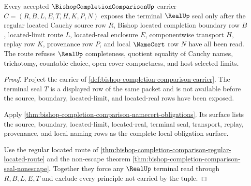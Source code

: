 \begin{theorem}
\label{thm:bishop-completion-comparison-real-route}
Every accepted $\BishopCompletionComparisonUp$ carrier $C=(R,B,L,E,T,H,K,P,N)$ exposes the terminal $\RealUp$ seal only after the regular located Cauchy source row $R$, Bishop located completion boundary row $B$, located-limit route $L$, located-real enclosure $E$, componentwise transport $H$, replay row $K$, provenance row $P$, and local $\NameCert$ row $N$ have all been read. The route refuses $\RealUp$ completeness, quotient equality of Cauchy names, trichotomy, countable choice, open-cover compactness, and host-selected limits.
\end{theorem}
\begin{proof}
Project the carrier of \autoref{def:bishop-completion-comparison-carrier}. The terminal seal $T$ is a displayed row of the same packet and is not available before the source, boundary, located-limit, and located-real rows have been exposed.

Apply \autoref{thm:bishop-completion-comparison-namecert-obligations}. Its surface lists the source, boundary, located-limit, located-real, terminal seal, transport, replay, provenance, and local naming rows as the complete local obligation surface.

Use the regular located route of \autoref{thm:bishop-completion-comparison-regular-located-route} and the non-escape theorem \autoref{thm:bishop-completion-comparison-seal-nonescape}. Together they force any $\RealUp$ terminal read through $R,B,L,E,T$ and exclude every principle not carried by the tuple.
\end{proof}

